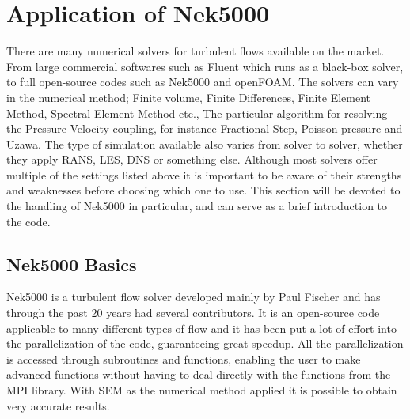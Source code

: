 
\chapter{Application of Nek5000} %

\label{nek} %




There are many numerical solvers for turbulent flows available on the market.
From large commercial softwares such as Fluent which runs as a 
black-box solver, to full open-source codes such as Nek5000 and openFOAM. 
The solvers can vary in the numerical method; Finite volume, Finite Differences, 
Finite Element Method, Spectral Element Method etc., The particular algorithm 
for resolving the Pressure-Velocity coupling, for instance Fractional Step, Poisson pressure and 
Uzawa. The type of simulation available also varies from solver to solver, whether
they apply RANS, LES, DNS or something else. Although most solvers offer multiple of the settings
listed above it is important to be aware of their strengths and weaknesses before choosing which 
one to use. This section will be devoted to the handling of Nek5000 in particular, and can serve
as a brief introduction to the code.

\section{Nek5000 Basics}

Nek5000 is a turbulent flow solver developed mainly by Paul Fischer
and has through the past 20 years had several contributors. 
It is an open-source code applicable to many different types of flow 
and it has been put a lot of effort into the parallelization of the code, 
guaranteeing great speedup. All the parallelization is accessed through subroutines
and functions, enabling the user to make advanced functions without having to 
deal directly with the functions from the MPI library.
With SEM as the numerical method applied it is possible to obtain very accurate results.  

